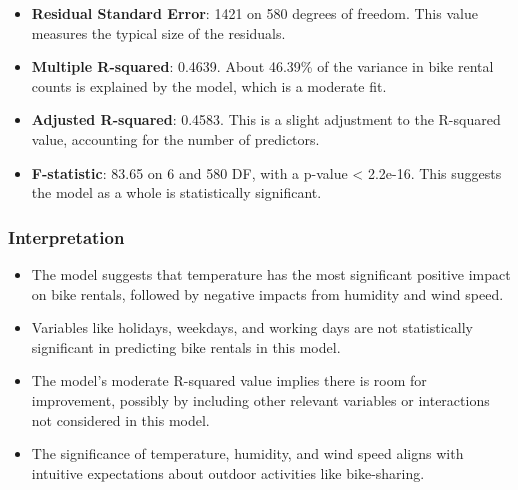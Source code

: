 \documentclass[
]{article}
\begin{document}
\begin{itemize}
\item
  \textbf{Residual Standard Error}: 1421 on 580 degrees of freedom. This
  value measures the typical size of the residuals.
\item
  \textbf{Multiple R-squared}: 0.4639. About 46.39\% of the variance in
  bike rental counts is explained by the model, which is a moderate fit.
\item
  \textbf{Adjusted R-squared}: 0.4583. This is a slight adjustment to
  the R-squared value, accounting for the number of predictors.
\item
  \textbf{F-statistic}: 83.65 on 6 and 580 DF, with a p-value
  \textless{} 2.2e-16. This suggests the model as a whole is
  statistically significant.
\end{itemize}

\subsubsection{\texorpdfstring{\textbf{Interpretation}}{Interpretation}}\label{interpretation-4}

\begin{itemize}
\item
  The model suggests that temperature has the most significant positive
  impact on bike rentals, followed by negative impacts from humidity and
  wind speed.
\item
  Variables like holidays, weekdays, and working days are not
  statistically significant in predicting bike rentals in this model.
\item
  The model's moderate R-squared value implies there is room for
  improvement, possibly by including other relevant variables or
  interactions not considered in this model.
\item
  The significance of temperature, humidity, and wind speed aligns with
  intuitive expectations about outdoor activities like bike-sharing.
\end{itemize}
\end{document}
